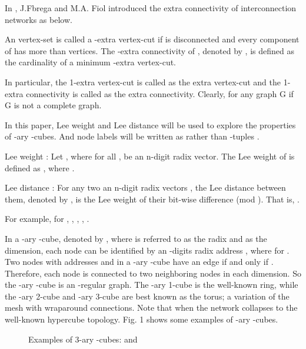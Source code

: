 \documentclass[preprint,number,12pt]{elsarticle}
\begin{document}
In \cite{F`abrega1994-p163-170}, J.Fbrega and M.A. Fiol introduced the extra connectivity of interconnection networks as below.

\begin{defn} \cite{F`abrega1994-p163-170}
An vertex-set  is called a -extra vertex-cut if  is disconnected and every component of  has more than  vertices. The -extra connectivity of , denoted by , is defined as the cardinality of a minimum -extra vertex-cut.
\end{defn}

In particular, the 1-extra vertex-cut is called as the extra vertex-cut and the 1-extra connectivity is called as the extra connectivity. Clearly,  for any graph G if G is not a complete graph.

In this paper, Lee weight and Lee distance will be used to explore the properties of -ary -cubes. And node labels will be written as  rather than -tuples .

\begin{defn}Lee weight \cite{Bose1995-p1021-1030}:
Let , where  for all , be an n-digit radix  vector. The Lee weight of  is defined as , where .
\end{defn}

\begin{defn}Lee distance \cite{Bose1995-p1021-1030}:
For any two an n-digit radix  vectors , the Lee distance between them, denoted by , is the Lee weight of their bit-wise difference (mod ). That is, .
\end{defn}

For example, for , , , , .

In a -ary -cube, denoted by , where  is referred to as the radix and  as the dimension, each node can be identified by an -digits radix  address , where  for .
Two nodes with addresses  and  in a -ary -cube have
an edge if and only if . Therefore, each node is connected to two neighboring nodes
in each dimension. So the -ary -cube is an -regular graph.
The -ary 1-cube is the well-known ring, while the -ary 2-cube and -ary 3-cube are best known as the torus; a variation of the mesh with wraparound connections. Note that when  the network collapses to the well-known hypercube topology. Fig. 1 shows some examples of -ary -cubes.

\begin{figure}\centering
{}
\caption{Examples of 3-ary -cubes:  and }
\end{figure}
\end{document}
